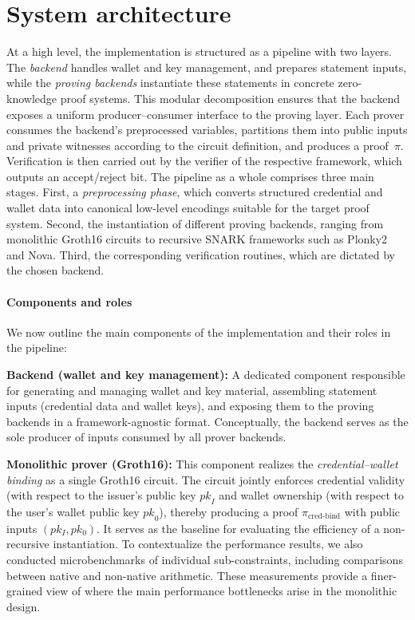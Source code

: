 \section{System architecture}
\label{sec:architecture}
At a high level, the implementation is structured as a pipeline with two layers. The \emph{backend} handles wallet and key management, and prepares statement inputs, while the \emph{proving backends} instantiate these statements in concrete zero-knowledge proof systems. This modular decomposition ensures that the backend exposes a uniform producer–consumer interface to the proving layer. Each prover consumes the backend’s preprocessed variables, partitions them into public inputs and private witnesses according to the circuit definition, and produces a proof~$\pi$. Verification is then carried out by the verifier of the respective framework, which outputs an accept/reject bit. The pipeline as a whole comprises three main stages. First, a \emph{preprocessing phase}, which converts structured credential and wallet data into canonical low-level encodings suitable for the target proof system. Second, the instantiation of different proving backends, ranging from monolithic Groth16 circuits to recursive SNARK frameworks such as Plonky2 and Nova. Third, the corresponding verification routines, which are dictated by the chosen backend.

\paragraph{Components and roles}
We now outline the main components of the implementation and their roles in the pipeline:

\medskip
\textbf{Backend (wallet and key management):} A dedicated component responsible for generating and managing wallet and key material, assembling statement inputs (credential data and wallet keys), and exposing them to the proving backends in a framework-agnostic format. Conceptually, the backend serves as the sole producer of inputs consumed by all prover backends.
	
\medskip
\textbf{Monolithic prover (Groth16):} This component realizes the \emph{credential–wallet binding} as a single Groth16 circuit. The circuit jointly enforces credential validity (with respect to the issuer’s public key $\mathit{pk}_I$ and wallet ownership (with respect to the user’s wallet public key $\mathit{pk}_0$), thereby producing a proof $\pi_{\text{cred-bind}}$ with public inputs $(pk_I, pk_0)$. It serves as the baseline for evaluating the efficiency of a non-recursive instantiation. To contextualize the performance results, we also conducted microbenchmarks of individual sub-constraints, including comparisons between native and non-native arithmetic. These measurements provide a finer-grained view of where the main performance bottlenecks arise in the monolithic design.

